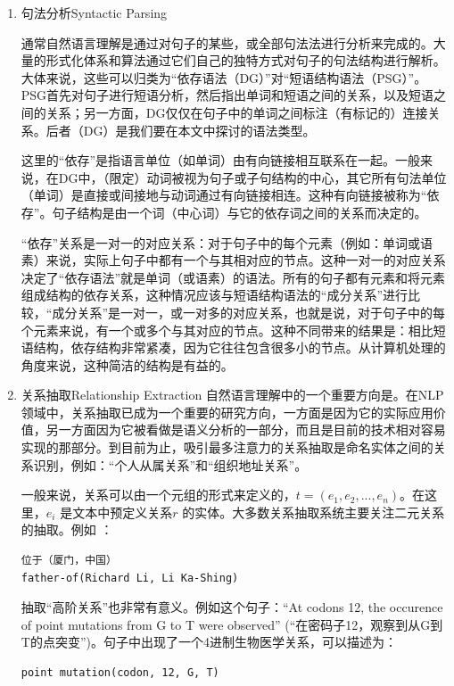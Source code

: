 \begin{enumerate}
\item{句法分析}{Syntactic Parsing}

通常自然语言理解是通过对句子的某些，或全部句法法进行分析来完成的。大量的形式化体系和算法通过它们自己的独特方式对句子的句法结构进行解析。大体来说，这些可以归类为“依存语法（DG）”对“短语结构语法（PSG）”。PSG首先对句子进行短语分析，然后指出单词和短语之间的关系，以及短语之间的关系；另一方面，DG仅仅在句子中的单词之间标注（有标记的）连接关系。后者（DG）是我们要在本文中探讨的语法类型。


这里的“依存”是指语言单位（如单词）由有向链接相互联系在一起。一般来说，在DG中，（限定）动词被视为句子或子句结构的中心，其它所有句法单位（单词）是直接或间接地与动词通过有向链接相连。这种有向链接被称为“依存”。句子结构是由一个词（中心词）与它的依存词之间的关系而决定的。


“依存”关系是一对一的对应关系：对于句子中的每个元素（例如：单词或语素）来说，实际上句子中都有一个与其相对应的节点。这种一对一的对应关系决定了“依存语法”就是单词（或语素）的语法。所有的句子都有元素和将元素组成结构的依存关系，这种情况应该与短语结构语法的“成分关系”进行比较，“成分关系”是一对一，或一对多的对应关系，也就是说，对于句子中的每个元素来说，有一个或多个与其对应的节点。这种不同带来的结果是：相比短语结构，依存结构非常紧凑，因为它往往包含很多小的节点。从计算机处理的角度来说，这种简洁的结构是有益的。


\item{关系抽取}{Relationship Extraction}
自然语言理解中的一个重要方向是{}。在NLP领域中，关系抽取已成为一个重要的研究方向，一方面是因为它的实际应用价值，另一方面因为它被看做是语义分析的一部分，而且是目前的技术相对容易实现的那部分。到目前为止，吸引最多注意力的关系抽取是命名实体之间的关系识别，例如：“个人从属关系”和“组织地址关系”。

一般来说，关系可以由一个元组的形式来定义的，$t = (e_1, e_2, ...,e_n)$。在这里，$e_i$ 是文本中预定义关系$r$ 的实体。大多数关系抽取系统主要关注二元关系的抽取。例如 ：

\begin{verbatim}
位于（厦门，中国）
father-of(Richard Li, Li Ka-Shing)
\end{verbatim}

抽取“高阶关系”也非常有意义。例如这个句子：``At codons 12, the occurence of point mutations from G to T were observed'' (“在密码子12，观察到从G到T的点突变”)。句子中出现了一个4进制生物医学关系，可以描述为：

\begin{verbatim}
point mutation(codon, 12, G, T)
\end{verbatim}


\end{enumerate}
